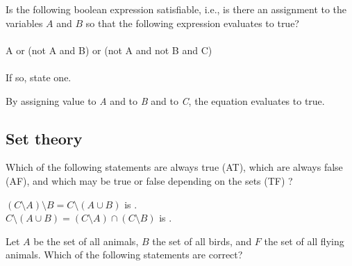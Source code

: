 \begin{question}
Is the following boolean expression satisfiable, i.e., is there an assignment to the variables $A$ and $B$ so that the following expression evaluates to true?  \\
\\
A or (not A and B) or (not A and not B and C)\\
\\
If so, state one.
\begin{solution}
By assigning value  to \emph{A} and  to \emph{B} and  to \emph{C}, the equation evaluates to true.
\end{solution}
\end{question}

\subsection*{Set theory}

\begin{question}
Which of the following statements are always true (AT), which are always false (AF), and which may be true or false depending on the sets (TF) ?
\begin{solution}
$(C \setminus A) \setminus B = C \setminus (A \cup B)$ is . \ \\
$ C \setminus (A \cup B) = (C \setminus A)  \cap (C \setminus B)$ is .
\end{solution}
\end{question}

\begin{question}
Let $A$ be the set of all animals, $B$ the set of all birds, and $F$
the set of all flying animals. Which of the following statements are correct?
\begin{solution}
\begin{multiple-choice}
\end{multiple-choice}
\end{solution}
\end{question}

